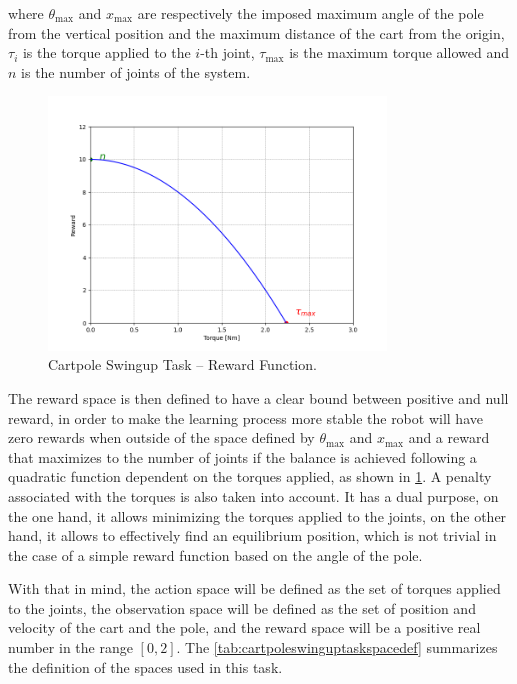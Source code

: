 where $\theta_{\text{max}}$ and $x _{\text{max}}$ are respectively the imposed maximum angle of the pole from the vertical position and the maximum distance of the cart from the origin, $\tau _i$ is the torque applied to the $i$-th joint, $\tau _{\text{max}}$ is the maximum torque allowed and $n$ is the number of joints of the system.

\begin{figure}
    \centering
    \includegraphics[width=0.8\textwidth]{Images/cartpole_reward.png}
    \caption{Cartpole Swingup Task -- Reward Function.}
    \label{fig:cartpolereward}
\end{figure}

The reward space is then defined to have a clear bound between positive and null reward, in order to make the learning process more stable the robot will have zero rewards when outside of the space defined by $\theta_{\text{max}}$ and $x _{\text{max}}$ and a reward that maximizes to the number of joints if the balance is achieved following a quadratic function dependent on the torques applied, as shown in \cref{fig:cartpolereward}. A penalty associated with the torques is also taken into account. It has a dual purpose, on the one hand, it allows minimizing the torques applied to the joints, on the other hand, it allows to effectively find an equilibrium position, which is not trivial in the case of a simple reward function based on the angle of the pole.

With that in mind, the action space will be defined as the set of torques applied to the joints, the observation space will be defined as the set of position and velocity of the cart and the pole, and the reward space will be a positive real number in the range $[0,2]$. The \cref{tab:cartpoleswinguptaskspacedef} summarizes the definition of the spaces used in this task.

